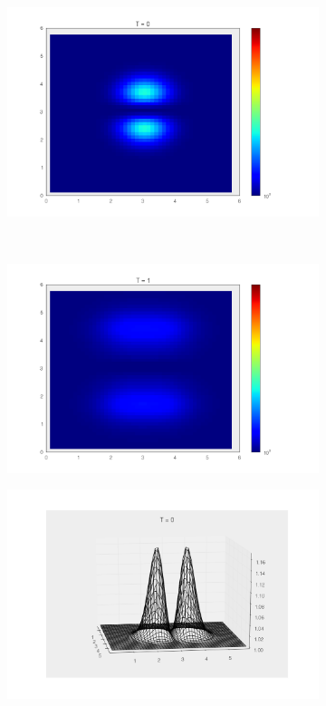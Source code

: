 \documentclass[paper=a4, fontsize=11pt, abstract=on]{scrartcl} %
\numberwithin{equation}{section}
\numberwithin{figure}{section}
\numberwithin{table}{section}
\begin{document}
\begin{figure}
  \centering
  \begin{subfigure}[b]{0.48\textwidth}
    \includegraphics[width=\textwidth]{pertinit}
    \caption{}
    \label{fig:pert1}
  \end{subfigure}
  ~
  \begin{subfigure}[b]{0.48\textwidth}
    \includegraphics[width=\textwidth]{pert1}
    \caption{}
    \label{fig:pert2}
  \end{subfigure}
\begin{subfigure}[b]{0.48\textwidth}
    \includegraphics[width=\textwidth]{wirepertinit}

\end{subfigure}
\end{figure}
\end{document}
